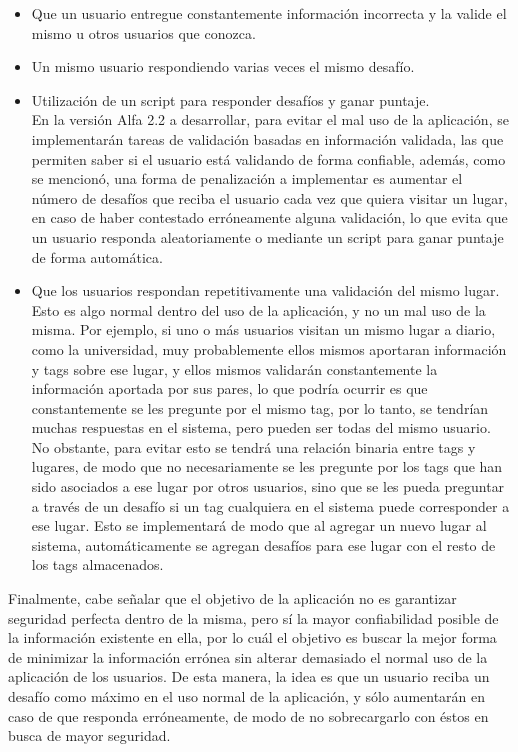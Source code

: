 \documentclass[10pt,letterpaper]{article}
\begin{document}
\begin{itemize}
\item Que un usuario entregue constantemente información incorrecta y la valide el mismo u otros usuarios que conozca.
\item Un mismo usuario respondiendo varias veces el mismo desafío.
\item Utilización de un script para responder desafíos y ganar puntaje.\\

En la versión Alfa 2.2 a desarrollar, para evitar el mal uso de la aplicación, se implementarán tareas de validación basadas en información validada, las que permiten saber si el usuario está validando de forma confiable, además, como se mencionó, una forma de penalización a implementar es aumentar el número de desafíos que reciba el usuario cada vez que quiera visitar un lugar, en caso de haber contestado erróneamente alguna validación, lo que evita que un usuario responda aleatoriamente o mediante un script para ganar puntaje de forma automática.\\

\item Que los usuarios respondan repetitivamente una validación del mismo lugar.\\

Esto es algo normal dentro del uso de la aplicación, y no un mal uso de la misma. Por ejemplo, si uno o más usuarios visitan un mismo lugar a diario, como la universidad, muy probablemente ellos mismos aportaran información y tags sobre ese lugar, y ellos mismos validarán constantemente la información aportada por sus pares, lo que podría ocurrir es que constantemente se les pregunte por el mismo tag, por lo tanto, se tendrían muchas respuestas en el sistema, pero pueden ser todas del mismo usuario. No obstante, para evitar esto se tendrá una relación binaria entre tags y lugares, de modo que no necesariamente se les pregunte por los tags que han sido asociados a ese lugar por otros usuarios, sino que se les pueda preguntar a través de un desafío si un tag cualquiera en el sistema puede corresponder a ese lugar. Esto se implementará de modo que al agregar un nuevo lugar al sistema, automáticamente se agregan desafíos para ese lugar con el resto de los tags almacenados.\\
\end{itemize}

Finalmente, cabe señalar que el objetivo de la aplicación no es garantizar seguridad perfecta dentro de la misma, pero sí la mayor confiabilidad posible de la información existente en ella, por lo cuál el objetivo es buscar la mejor forma de minimizar la información errónea sin alterar demasiado el normal uso de la aplicación de los usuarios. De esta manera, la idea es que un usuario reciba un desafío como máximo en el uso normal de la aplicación, y sólo aumentarán en caso de que responda erróneamente, de modo de no sobrecargarlo con éstos en busca de mayor seguridad.
\end{document}
